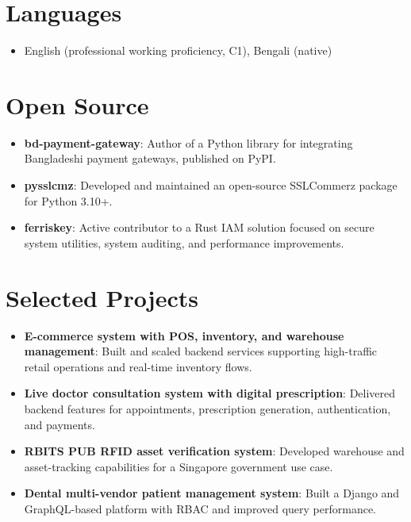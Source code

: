 \documentclass[11pt,a4paper,sans]{moderncv}
\begin{document}

\section{Languages}
\vspace{1pt}
\begin{itemize}
\item English (professional working proficiency, C1), Bengali (native)
\end{itemize}



\section{Open Source}
\vspace{1pt}
\begin{itemize}
\item \textbf{bd-payment-gateway}: Author of a Python library for integrating Bangladeshi payment gateways, published on PyPI.
\item \textbf{pysslcmz}: Developed and maintained an open-source SSLCommerz package for Python 3.10+.
\item \textbf{ferriskey}: Active contributor to a Rust IAM solution focused on secure system utilities, system auditing, and performance improvements.
\end{itemize}


\section{Selected Projects}
\vspace{1pt}
\begin{itemize}
\item \textbf{E-commerce system with POS, inventory, and warehouse management}: Built and scaled backend services supporting high-traffic retail operations and real-time inventory flows.
\item \textbf{Live doctor consultation system with digital prescription}: Delivered backend features for appointments, prescription generation, authentication, and payments.
\item \textbf{RBITS PUB RFID asset verification system}: Developed warehouse and asset-tracking capabilities for a Singapore government use case.
\item \textbf{Dental multi-vendor patient management system}: Built a Django and GraphQL-based platform with RBAC and improved query performance.
\end{itemize}
\end{document}
